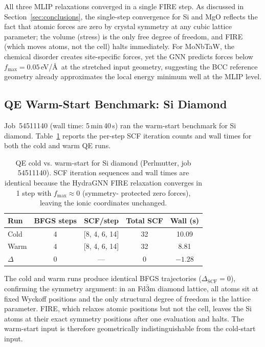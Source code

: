 \documentclass[conference]{IEEEtran}
\def\acs#1{#1}%
\begin{document}
All three \acs{MLIP} relaxations converged in a single \acs{FIRE} step. As discussed in
Section~\ref{sec:conclusions}, the single-step convergence for Si and MgO
reflects the fact that atomic forces are zero by crystal symmetry at any cubic
lattice parameter; the volume (stress) is the only free degree of freedom, and
\acs{FIRE} (which moves atoms, not the cell) halts immediately. For MoNbTaW, the
chemical disorder creates site-specific forces, yet the \acs{GNN} predicts forces
below $f_\text{max} = 0.05$\,eV/\AA\ at the stretched input geometry,
suggesting the BCC reference geometry already approximates the local energy
minimum well at the \acs{MLIP} level.

\subsection{QE Warm-Start Benchmark: Si Diamond}
\label{sec:results:warmstart_si}
Job~54511140 (wall time: 5\,min\,40\,s) ran the warm-start benchmark for Si
diamond. Table~\ref{tab:warmstart_si} reports the per-step \acs{SCF} iteration
counts and wall times for both the cold and warm \acs{QE} runs.

\begin{table}[t]
\centering
\caption{\acs{QE} cold vs. warm-start for Si diamond (Perlmutter, job 54511140).
\acs{SCF} iteration sequences and wall times are identical because the HydraGNN
\acs{FIRE} relaxation converges in 1 step with $f_\text{max} \approx 0$ (symmetry-
protected zero forces), leaving the ionic coordinates unchanged.}
\label{tab:warmstart_si}
\begin{tabular}{lcccc}
\toprule
Run & \acs{BFGS} steps & \acs{SCF}/step & Total \acs{SCF} & Wall (s)\\
\midrule
Cold & 4 & [8, 4, 6, 14] & 32 & 10.09 \\
Warm & 4 & [8, 4, 6, 14] & 32 &  8.81 \\
\midrule
$\Delta$ & 0 & --- & 0 & $-1.28$ \\
\bottomrule
\end{tabular}
\end{table}

The cold and warm runs produce identical \acs{BFGS} trajectories ($\Delta_\text{SCF}
= 0$), confirming the symmetry argument: in an Fd$\bar{3}$m diamond lattice,
all atoms sit at fixed Wyckoff positions and the only structural degree of
freedom is the lattice parameter. \acs{FIRE}, which relaxes atomic positions but not
the cell, leaves the Si atoms at their exact symmetry positions after one
evaluation and halts. The warm-start input is therefore geometrically
indistinguishable from the cold-start input.
\end{document}

